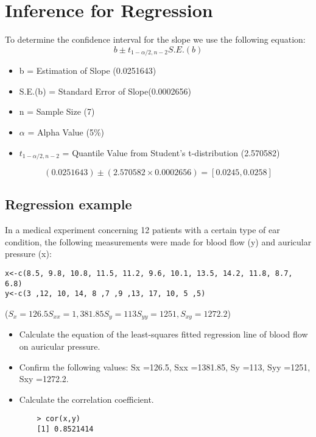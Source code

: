 \documentclass[]{report}
\begin{document}
\bigskip

\section{Inference for Regression}
To determine the confidence interval for the slope we use the
following equation:
\begin{equation}
b \pm t_{1-\alpha/2,n-2} S.E.(b)
\end{equation}

\begin{itemize}
	\item b = Estimation of Slope (0.0251643) \item S.E.(b) = Standard
	Error of Slope(0.0002656) \item n = Sample Size (7) \item $\alpha$
	= Alpha Value (5\%) \item $t_{1-\alpha/2,n-2}$ = Quantile Value
	from Student’s t-distribution (2.570582)
\end{itemize}

\begin{equation}
(0.0251643) \pm ( 2.570582 \times 0.0002656) = [ 0.0245,0.0258 ]
\end{equation}


\subsection{Regression example}

In a medical experiment concerning 12 patients with a certain type of ear condition,
the following measurements were made for blood flow (y) and auricular pressure (x):

\begin{verbatim}
x<-c(8.5, 9.8, 10.8, 11.5, 11.2, 9.6, 10.1, 13.5, 14.2, 11.8, 8.7, 6.8)
y<-c(3 ,12, 10, 14, 8 ,7 ,9 ,13, 17, 10, 5 ,5)
\end{verbatim}


($S_x =126.5 S_{xx} =1,381.85 S_y =113 S_{yy} =1251, S_{xy} =1272.2$)


\begin{itemize}
	\item Calculate the equation of the least-squares fitted regression line of blood flow
	on auricular pressure.
	\item Confirm the following values: Sx =126.5, Sxx =1381.85, Sy =113, Syy =1251, Sxy =1272.2.
	\item Calculate the correlation coefficient.
	
	\begin{verbatim}
	> cor(x,y)
	[1] 0.8521414
	\end{verbatim}
\end{itemize}
\end{document}
